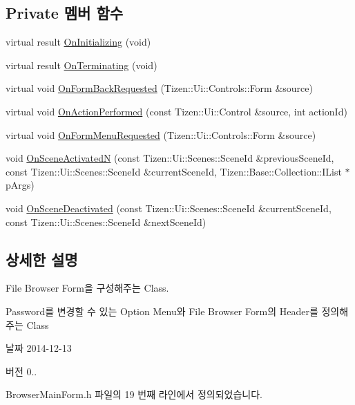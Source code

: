 \subsection*{Private 멤버 함수}
\begin{DoxyCompactItemize}
\item 
virtual result \hyperlink{class_browser_main_form_ae255219c114d47061ee45bd3f46764fd}{On\+Initializing} (void)
\item 
virtual result \hyperlink{class_browser_main_form_a02d722d1c1ba5fd373bf687ef64eaec2}{On\+Terminating} (void)
\item 
virtual void \hyperlink{class_browser_main_form_a63ee65c2094bf2fba5b05d7bc3d79c75}{On\+Form\+Back\+Requested} (Tizen\+::\+Ui\+::\+Controls\+::\+Form \&source)
\item 
virtual void \hyperlink{class_browser_main_form_a6bdcd8ad801f22d26e080329c802e8c5}{On\+Action\+Performed} (const Tizen\+::\+Ui\+::\+Control \&source, int action\+Id)
\item 
virtual void \hyperlink{class_browser_main_form_a5617fd83776b9a4023f7393471d1b29f}{On\+Form\+Menu\+Requested} (Tizen\+::\+Ui\+::\+Controls\+::\+Form \&source)
\item 
void \hyperlink{class_browser_main_form_ab4dda0a9d8e78bc5cfd18c55514836a1}{On\+Scene\+Activated\+N} (const Tizen\+::\+Ui\+::\+Scenes\+::\+Scene\+Id \&previous\+Scene\+Id, const Tizen\+::\+Ui\+::\+Scenes\+::\+Scene\+Id \&current\+Scene\+Id, Tizen\+::\+Base\+::\+Collection\+::\+I\+List $\ast$p\+Args)
\item 
void \hyperlink{class_browser_main_form_ae128a257f33eead52e36476659e0e798}{On\+Scene\+Deactivated} (const Tizen\+::\+Ui\+::\+Scenes\+::\+Scene\+Id \&current\+Scene\+Id, const Tizen\+::\+Ui\+::\+Scenes\+::\+Scene\+Id \&next\+Scene\+Id)
\end{DoxyCompactItemize}


\subsection{상세한 설명}
File Browser Form을 구성해주는 Class. 

Password를 변경할 수 있는 Option Menu와 File Browser Form의 Header를 정의해 주는 Class \begin{DoxyDate}{날짜}
2014-\/12-\/13 
\end{DoxyDate}
\begin{DoxyVersion}{버전}
0.. 
\end{DoxyVersion}


Browser\+Main\+Form.\+h 파일의 19 번째 라인에서 정의되었습니다.



